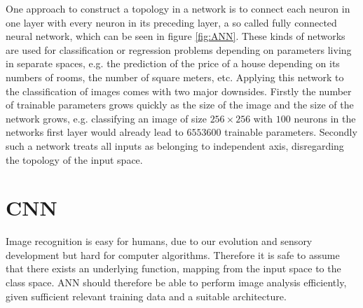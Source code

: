 One approach to construct a topology in a network is to connect each neuron in one layer with every neuron in its preceding layer, a so called fully connected neural network, which can be seen in figure \ref{fig:ANN}. These kinds of networks are used for classification or regression problems depending on parameters living in separate spaces, e.g. the prediction of the price of a house depending on its numbers of rooms, the number of square meters, etc. Applying this network to the classification of images comes with two major downsides. Firstly the number of trainable parameters grows quickly as the size of the image and the size of the network grows, e.g. classifying an image of size $256\times 256$ with $100$ neurons in the networks first layer would already lead to $6553600$ trainable parameters. Secondly such a network treats all inputs as belonging to independent axis, disregarding the topology of the input space.

\section{CNN}\label{sec:DiscreteConvolutions}
Image recognition is easy for humans, due to our evolution and sensory development but hard for computer algorithms. Therefore it is safe to assume that there exists an underlying function, mapping from the input space to the class space. ANN should therefore be able to perform image analysis efficiently, given sufficient relevant training data and a suitable architecture. \\



